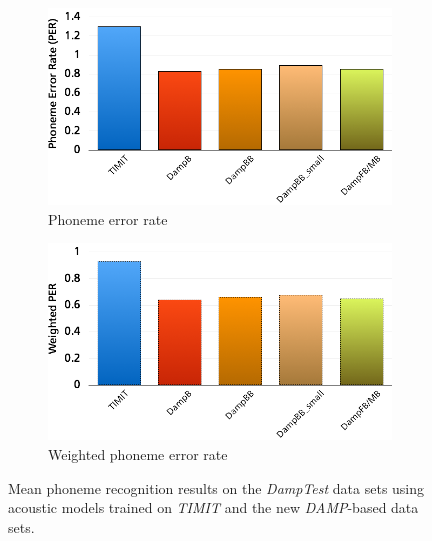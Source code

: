 \begin{figure}
	\centering
	\begin{subfigure}[t]{0.5\textwidth}
		\includegraphics[width=\textwidth]{images/res_phonerec_sizes.png}
		\caption{Phoneme error rate}
		
	\end{subfigure}%
	\begin{subfigure}[t]{0.5\textwidth}
		\includegraphics[width=\textwidth]{images/res_phonerec_sizes_w.png}
		\caption{Weighted phoneme error rate}
	\end{subfigure}
	\caption{Mean phoneme recognition results on the \textit{DampTest} data sets using acoustic models trained on \textit{TIMIT} and the new \textit{DAMP}-based data sets.}\label{fig:res_phonerec_sizes}
\end{figure}

